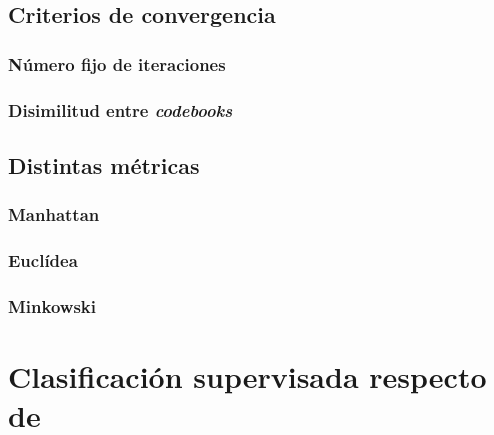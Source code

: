 \documentclass[10pt,a4paper]{article}
\begin{document}
\subsection{Criterios de convergencia}

\subsubsection{Número fijo de iteraciones}

\subsubsection{Disimilitud entre \textit{codebooks}}

\subsection{Distintas métricas}

\subsubsection{Manhattan}

\subsubsection{Euclídea}

\subsubsection{Minkowski}

\section{Clasificación supervisada respecto de }
\end{document}

